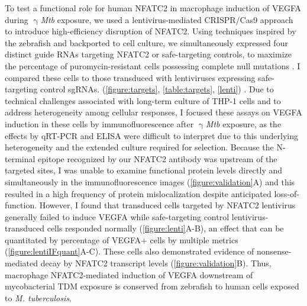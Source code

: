 To test a functional role for human NFATC2 in macrophage induction of VEGFA during $\upgamma$\textit{Mtb} exposure, we used a lentivirus\hyp{}mediated CRISPR/Cas9 approach to introduce high\hyp{}efficiency disruption of NFATC2. Using techniques inspired by the zebrafish and backported to cell culture, we simultaneously expressed four distinct guide RNAs targeting NFATC2 or safe\hyp{}targeting controls, to maximize the percentage of puromycin\hyp{}resistant cells possessing complete null mutations \citep{Wu2018}. I compared these cells to those transduced with lentiviruses expressing safe\hyp{}targeting control sgRNAs. (\autoref{figure:targets}, \autoref{table:targets}, \autoref{lenti}) \citep{Kabadi2014, Sanjana2014, Morgens2017, Kitamura2021}. Due to technical challenges associated with long\hyp{}term culture of THP\hyp{}1 cells and to address heterogeneity among cellular responses, I focused these assays on VEGFA induction in these cells by immunofluorescence after $\upgamma$\textit{Mtb} exposure, as the effects by qRT-PCR and ELISA were difficult to interpret due to this underlying heterogeneity and the extended culture required for selection. Because the N\hyp{}terminal epitope recognized by our NFATC2 antibody was upstream of the targeted sites, I was unable to examine functional protein levels directly and simultaneously in the immunofluorescence images (\autoref{figure:validation}A) and this resulted in a high frequency of protein mislocalization despite anticipated loss-of-function. However, I found that transduced cells targeted by NFATC2 lentivirus generally failed to induce VEGFA while safe\hyp{}targeting control lentivirus\hyp{}transduced cells responded normally (\autoref{figure:lenti}A\hyp{}B), an effect that can be quantitated by percentage of VEGFA+ cells by multiple metrics (\autoref{figure:lentiIFquant}A\hyp{}C). These cells also demonstrated evidence of nonsense\hyp{}mediated decay by NFATC2 transcript levels (\autoref{figure:validation}B). Thus, macrophage NFATC2\hyp{}mediated induction of VEGFA downstream of mycobacterial TDM exposure is conserved from zebrafish to human cells exposed to \textit{M. tuberculosis}.

